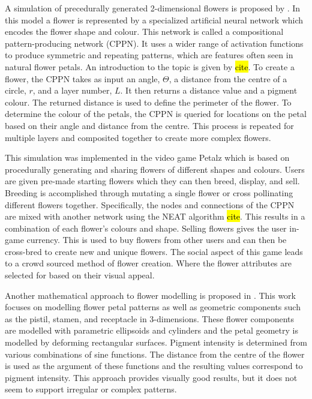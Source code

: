 A simulation of precedurally generated 2-dimensional flowers is proposed by \cite{risi2012}. In this model a flower is represented by a specialized artificial neural network which encodes the flower shape and colour. This network is called a compositional pattern-producing network (CPPN). It uses a wider range of activation functions to produce symmetric and repeating patterns, which are features often seen in natural flower petals. An introduction to the topic is given by \hl{cite}. To create a flower, the CPPN takes as input an angle, $\Theta$, a distance from the centre of a circle, $r$, and a layer number, $L$. It then returns a distance value and a pigment colour. The returned distance is used to define the perimeter of the flower. To determine the colour of the petals, the CPPN is queried for locations on the petal based on their angle and distance from the centre. This process is repeated for multiple layers and composited together to create more complex flowers. 

This simulation was implemented in the video game Petalz which is based on procedurally generating and sharing flowers of different shapes and colours. Users are given pre-made starting flowers which they can then breed, display, and sell. Breeding is accomplished through mutating a single flower or cross pollinating different flowers together. Specifically, the nodes and connections of the CPPN are mixed with another network using the NEAT algorithm \hl{cite}. This results in a combination of each flower's colours and shape. Selling flowers gives the user in-game currency. This is used to buy flowers from other users and can then be cross-bred to create new and unique flowers. The social aspect of this game leads to a crowd sourced method of flower creation. Where the flower attributes are selected for based on their visual appeal.

Another mathematical approach to flower modelling is proposed in \cite{lu2014}. This work focuses on modelling flower petal patterns as well as geometric components such as the pistil, stamen, and receptacle in 3-dimensions. These flower components are modelled with parametric ellipsoids and cylinders and the petal geometry is modelled by deforming rectangular surfaces. Pigment intensity is determined from various combinations of sine functions. The distance from the centre of the flower is used as the argument of these functions and the resulting values correspond to pigment intensity. This approach provides visually good results, but it does not seem to support irregular or complex patterns.

